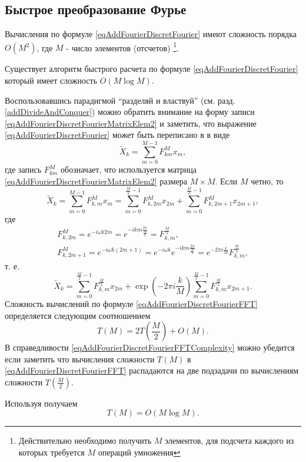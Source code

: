 \subsection{Быстрое преобразование Фурье}
Вычисления по формуле \eqref{eqAddFourierDiscretFourier} имеют
сложность порядка $O\left(M^2\right)$, где $M$ - число элементов (отсчетов)
\footnote{Действительно необходимо получить $M$ элементов, для
  подсчета каждого из которых требуется $M$ операций умножения}. 

Существует алгоритм быстрого расчета по формуле
\eqref{eqAddFourierDiscretFourier} который имеет сложность
$O\left(M \log{M}\right)$.

Воспользовавшись парадигмой ``разделяй и властвуй''
(см. разд. \ref{addDivideAndConquer}) можно 
обратить внимание на форму записи
\eqref{eqAddFourierDiscretFourierMatrixElem2} и 
заметить, что выражение
\eqref{eqAddFourierDiscretFourier} может быть переписано в
в виде 
\begin{equation}
\tilde{X}_k = \sum^{M - 1}_{m = 0} F_{km}^{M} x_m,
\nonumber
\end{equation}
где запись $F_{km}^{M}$ обозначает, что используется матрица
\eqref{eqAddFourierDiscretFourierMatrixElem2} размера $M\times M$.
Если $M$ четно, то 
\begin{equation}
\tilde{X}_k = \sum^{M - 1}_{m = 0} F_{k,m}^{M} x_m = 
\sum^{\frac{M}{2} - 1}_{m = 0} F_{k,2m}^M x_{2m} +
\sum^{\frac{M}{2} - 1}_{m = 0} F_{k,2m + 1}^M x_{2m + 1},
\nonumber
\end{equation}
где
\begin{eqnarray}
F_{k,2m}^{M} = e^{-i \omega k 2m} = e^{-i k m \frac{2\pi}{\frac{M}{2}}
} = F_{k,m}^{\frac{M}{2}},
\nonumber \\
F_{k,2m + 1}^{M} = e^{-i \omega k \left(2m+1\right)} = 
e^{-i \omega k}e^{-i k m \frac{2\pi}{\frac{M}{2}}} = 
e^{-2\pi i \frac{k}{M}}F_{k,m}^{\frac{M}{2}},
\nonumber
\end{eqnarray}
т. е.
\begin{equation}
\tilde{X}_k = \sum^{\frac{M}{2} - 1}_{m = 0} F_{k,m}^{\frac{M}{2}} x_{2m} +
\exp{\left(-2\pi i \frac{k}{M}\right)}
\sum^{\frac{M}{2} - 1}_{m = 0}  F_{k,m}^{\frac{M}{2}} x_{2m + 1}.
\label{eqAddFourierDiscretFourierFFT}
\end{equation}
Сложность вычислений по формуле
\eqref{eqAddFourierDiscretFourierFFT} определяется 
следующим соотношением
\begin{equation}
T\left( M \right) = 2 T\left( \frac{M}{2} \right) + O\left( M \right).
\label{eqAddFourierDiscretFourierFFTComplexity}
\end{equation}
В справедливости
\eqref{eqAddFourierDiscretFourierFFTComplexity} можно убедится
если заметить что вычисления сложности $T\left( M \right)$ в 
\eqref{eqAddFourierDiscretFourierFFT} распадаются 
на две подзадачи по вычислениям сложности $T\left( \frac{M}{2}
\right)$.

Используя  получаем 
\begin{equation}
T\left( M \right) = O\left( M \log{M} \right).
\nonumber
\end{equation}

